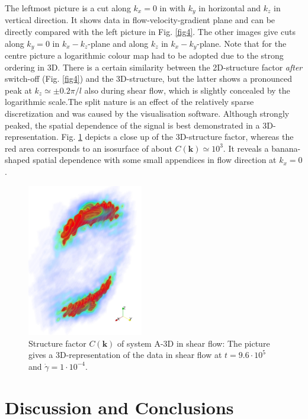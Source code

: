 \documentclass[8.5pt,twoside,twocolumn]{article}
\newcommand{\e}[1]{\cdot10^{#1}}
\begin{document}
The leftmost picture is a cut along $k_x=0$ in with $k_y$ in horizontal and $k_z$ in vertical direction.
It shows data in flow-velocity-gradient plane and can be directly compared with the left picture in Fig. \ref{fig4}.
The other images give cuts along $k_y=0$ in $k_x-k_z$-plane and along $k_z$ in $k_x-k_y$-plane. 
Note that for the centre picture a logarithmic colour map had to be adopted due to the strong ordering in 3D.
There is a certain similarity between the 2D-structure factor {\it after} switch-off (Fig. \ref{fig4}) and the 3D-structure, but the latter shows a pronounced peak at $k_z\simeq\pm0.2\pi/l$ also during shear flow, which is slightly concealed by the logarithmic scale.The split nature is an effect of the relatively sparse discretization and was caused by the visualisation software.
Although strongly peaked, the spatial dependence of the signal is best demonstrated in a 3D-representation. 
Fig. \ref{fig15} depicts a close up of the 3D-structure factor, whereas the red area corresponds to an isosurface of about $C({\bm k})\simeq 10^3$.
It reveals a banana-shaped spatial dependence with some small appendices in flow direction at $k_x=0$.

\begin{figure}[htp!]
\centering
\includegraphics[angle=0,width=0.45\textwidth]{ck_run788_960_zoom.jpg}
\caption{Structure factor $C({\mathbf k})$ of system A-3D in shear flow: The picture gives a 3D-representation of the data in shear flow at $t=9.6\e{5}$ and $\dot{\gamma}=1\cdot10^{-4}$.}
\label{fig15}
\end{figure}

\section{Discussion and Conclusions}
\end{document}
